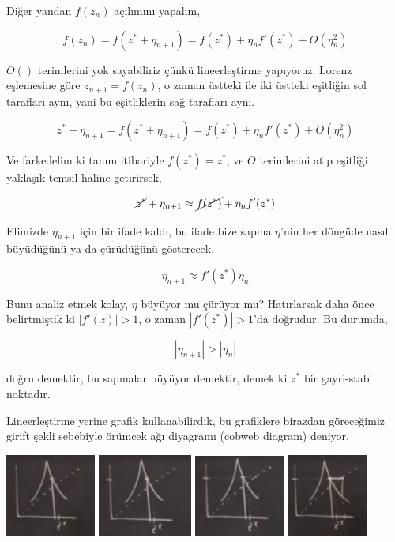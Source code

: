 \documentclass[12pt,fleqn]{article}\usepackage{../../common}
\begin{document}
Diğer yandan $f(z_n)$ açılımını yapalım,

$$ 
f(z_n) =  f(z^\ast + \eta_{n+1}) = f(z^\ast) + \eta_n f'(z^\ast) + O(\eta_n^2)
$$

$O()$ terimlerini yok sayabiliriz çünkü lineerleştirme yapıyoruz. Lorenz
eşlemesine göre $z_{n+1} = f(z_n)$, o zaman üstteki ile iki üstteki
eşitliğin sol tarafları aynı, yani bu eşitliklerin sağ tarafları aynı.

$$ 
z^\ast + \eta_{n+1} =  f(z^\ast + \eta_{n+1}) = f(z^\ast) + \eta_n f'(z^\ast) +
O(\eta_n^2)
$$

Ve farkedelim ki tanım itibariyle $f(z^\ast) = z^\ast$, ve $O$ terimlerini atıp
eşitliği yaklaşık temsil haline getirirsek,

$$ 
\cancel{z^\ast} + \eta_{n+1} \approx \cancel{f(z^\ast)} + \eta_n f'(z^\ast) 
$$

Elimizde $\eta_{n+1}$ için bir ifade kaldı, bu ifade bize sapma $\eta$'nin
her döngüde nasıl büyüdüğünü ya da çürüdüğünü gösterecek.

$$ \eta_{n+1} \approx f'(z^\ast) \eta_n $$

Bunu analiz etmek kolay, $\eta$ büyüyor mu çürüyor mu? Hatırlarsak daha
önce belirtmiştik ki $|f'(z)| > 1$, o zaman $|f'(z^\ast)| > 1$'da doğrudur. Bu
durumda,

$$ |\eta_{n+1}| > |\eta_n| $$

doğru demektir, bu sapmalar büyüyor demektir, demek ki $z^\ast$ bir
gayri-stabil noktadır.

Lineerleştirme yerine grafik kullanabilirdik, bu grafiklere birazdan
göreceğimiz girift şekli sebebiyle örümcek ağı diyagramı (cobweb diagram)
deniyor. 

\includegraphics[width=8em]{18_11.png}
\includegraphics[width=8.4em]{18_12.png}
\includegraphics[width=8.1em]{18_14.png}
\includegraphics[width=7.1em]{18_15.png}
\end{document}
